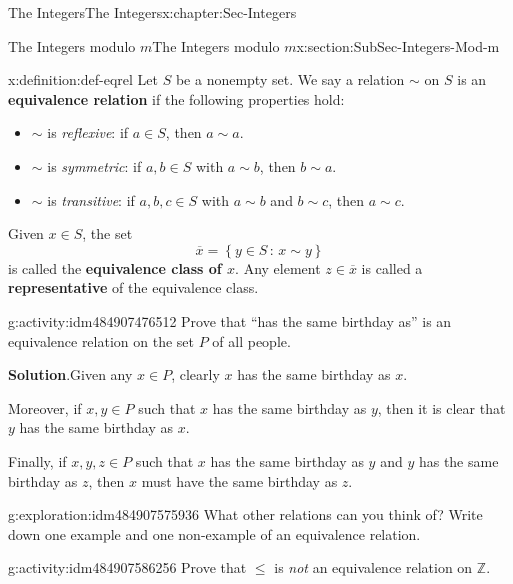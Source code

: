 \documentclass[oneside,10pt,]{book}
\newcommand{\blocktitlefont}{\relax}
\newcommand{\terminology}[1]{\textbf{#1}}
\numberwithin{equation}{section}
\renewcommand{\le}{\leqslant}
\newcommand{\setof}[2]{{\left\{#1\,\colon\,#2\right\}}}
\def\Z{{\mathbb Z}}
\begin{document}
\begin{chapterptx}{The Integers}{}{The Integers}{}{}{x:chapter:Sec-Integers}
\begin{sectionptx}{The Integers modulo \(m\)}{}{The Integers modulo \(m\)}{}{}{x:section:SubSec-Integers-Mod-m}
\begin{definition}{}{x:definition:def-eqrel}%
%
%
%
Let \(S\) be a nonempty set. We say a relation \(\sim\) on \(S\) is an \terminology{equivalence relation} if the following properties hold:%
\begin{itemize}[label=\textbullet]
\item{}\(\sim\) is \emph{reflexive}: if \(a\in S\), then \(a\sim a\).%
\item{}\(\sim\) is \emph{symmetric}: if \(a,b\in S\) with \(a\sim b\), then \(b\sim a\).%
\item{}\(\sim\) is \emph{transitive}: if \(a,b,c\in S\) with \(a\sim b\) and \(b\sim c\), then \(a\sim c\).%
\end{itemize}
%
\par
Given \(x\in S\), the set%
\begin{equation*}
\overline{x} = \setof{y\in S}{x\sim y}
\end{equation*}
is called the \terminology{equivalence class of \(x\)}. Any element \(z\in \overline{x}\) is called a \terminology{representative} of the equivalence class.%
\end{definition}
\begin{activity}{}{g:activity:idm484907476512}%
Prove that ``has the same birthday as'' is an equivalence relation on the set \(P\) of all people.%
\par\smallskip%
\noindent\textbf{\blocktitlefont Solution}.\hypertarget{g:solution:idm484907498432}{}\quad{}Given any \(x\in P\), clearly \(x\) has the same birthday as \(x\).%
\par
Moreover, if \(x,y\in P\) such that \(x\) has the same birthday as \(y\), then it is clear that \(y\) has the same birthday as \(x\).%
\par
Finally, if \(x,y,z\in P\) such that \(x\) has the same birthday as \(y\) and \(y\) has the same birthday as \(z\), then \(x\) must have the same birthday as \(z\).%
\end{activity}
\begin{exploration}{}{g:exploration:idm484907575936}%
What other relations can you think of? Write down one example and one non-example of an equivalence relation.%
\end{exploration}
\begin{activity}{}{g:activity:idm484907586256}%
Prove that \(\le\) is \emph{not} an equivalence relation on \(\Z\).%
\par\smallskip%

\end{activity}
\end{sectionptx}
\end{chapterptx}
\end{document}
